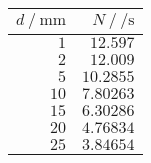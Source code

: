 \begin{tabular}{rr}
	\toprule
	$d ~/~ \si{\milli\meter}$ & $N ~/~ \si{\per\second}$\\
	\midrule
	$\num{1}$ & $\num{12.597}$ \\
	$\num{2}$ & $\num{12.009}$ \\
	$\num{5}$ & $\num{10.2855}$ \\
	$\num{10}$ & $\num{7.80263}$ \\
	$\num{15}$ & $\num{6.30286}$ \\
	$\num{20}$ & $\num{4.76834}$ \\
	$\num{25}$ & $\num{3.84654}$ \\
	\bottomrule
\end{tabular}
